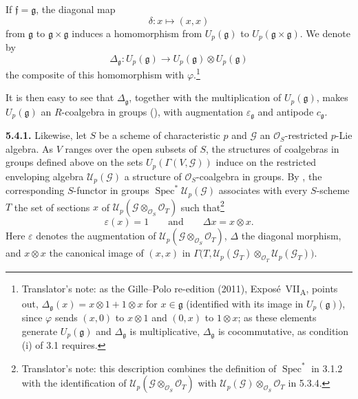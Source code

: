 If \(\mathfrak f=\mathfrak g\), the diagonal map
\[
  \delta:x\longmapsto(x,x)
\]
from \(\mathfrak g\) to
\(\mathfrak g\times\mathfrak g\) induces a homomorphism from
\(U_p(\mathfrak g)\) to
\(U_p(\mathfrak g\times\mathfrak g)\). We denote by
\[
  \Delta_{\mathfrak g}:
  U_p(\mathfrak g)
  \longrightarrow
  U_p(\mathfrak g)\otimes U_p(\mathfrak g)
\]
the composite of this homomorphism with \(\varphi\).\footnote{Translator's
note: as the Gille--Polo re-edition (2011),
Expos\'e~VII\textsubscript{A}, points out,
\(\Delta_{\mathfrak g}(x)=x\otimes1+1\otimes x\) for \(x\in\mathfrak g\)
(identified with its image in \(U_p(\mathfrak g)\)), since \(\varphi\)
sends \((x,0)\) to \(x\otimes1\) and \((0,x)\) to \(1\otimes x\); as
these elements generate \(U_p(\mathfrak g)\) and \(\Delta_{\mathfrak g}\)
is multiplicative, \(\Delta_{\mathfrak g}\) is cocommutative, as condition
(i) of 3.1 requires.}

It is then easy to see that \(\Delta_{\mathfrak g}\), together
with the multiplication of \(U_p(\mathfrak g)\), makes
\(U_p(\mathfrak g)\) an \(R\)-coalgebra in groups (), with
augmentation \(\varepsilon_{\mathfrak g}\) and antipode
\(c_{\mathfrak g}\).

\medskip
\noindent\textbf{5.4.1.}
\label{sga3:VIIA:5.4.1}
Likewise, let \(S\) be a scheme of characteristic \(p\) and
\(\mathcal G\) an \(\mathcal O_S\)-restricted \(p\)-Lie algebra. As \(V\)
ranges over the open subsets of \(S\), the structures of coalgebras in
groups defined above on the sets \(U_p(\Gamma(V,\mathcal G))\) induce on
the restricted enveloping algebra \(\mathcal U_p(\mathcal G)\) a
structure of \(\mathcal O_S\)-coalgebra in groups. By , the
corresponding \(S\)-functor in groups
\(\operatorname{Spec}^{*}\mathcal U_p(\mathcal G)\) associates with every
\(S\)-scheme \(T\) the set of sections \(x\) of
\(\mathcal U_p(\mathcal G\otimes_{\mathcal O_S}\mathcal O_T)\) such
that\footnote{Translator's note: this description combines the
definition of \(\operatorname{Spec}^{*}\) in 3.1.2 with the
identification of
\(\mathcal U_p(\mathcal G\otimes_{\mathcal O_S}\mathcal O_T)\) with
\(\mathcal U_p(\mathcal G)\otimes_{\mathcal O_S}\mathcal O_T\) in
5.3.4.}
\[
  \varepsilon(x)=1
  \qquad\text{and}\qquad
  \Delta x=x\otimes x.
\]
Here \(\varepsilon\) denotes the augmentation of
\(\mathcal U_p(\mathcal G\otimes_{\mathcal O_S}\mathcal O_T)\), \(\Delta\)
the diagonal morphism, and \(x\otimes x\) the canonical image of
\((x,x)\) in
\(\Gamma\bigl(T,\mathcal U_p(\mathcal G_T)\otimes_{\mathcal O_T}
\mathcal U_p(\mathcal G_T)\bigr)\).

